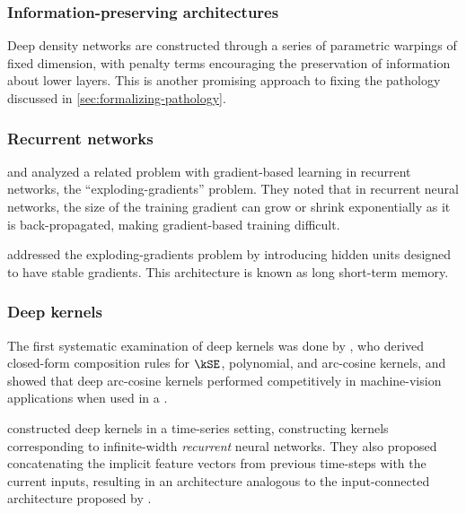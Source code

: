 \documentclass{article} %
\begin{document}
%
%
%

\subsubsection{Information-preserving architectures}
Deep density networks \citep{rippel2013high} are constructed through a series of parametric warpings of fixed dimension, with penalty terms encouraging the preservation of information about lower layers.
This is another promising approach to fixing the pathology discussed in \cref{sec:formalizing-pathology}.

\subsubsection{Recurrent networks}
\citet{bengio1994learning} and \citet{pascanu2012understanding} analyzed a related problem with gradient-based learning in recurrent networks, the ``exploding-gradients'' problem.
They noted that in recurrent neural networks, the size of the training gradient can grow or shrink exponentially as it is back-propagated, making gradient-based training difficult.

\citet{hochreiter1997long} addressed the exploding-gradients problem by introducing hidden units designed to have stable gradients.
This architecture is known as long short-term memory.

\subsubsection{Deep kernels}

The first systematic examination of deep kernels was done by \citet{cho2009kernel}, who derived closed-form composition rules for $\kSE$, polynomial, and arc-cosine kernels, and showed that deep arc-cosine kernels performed competitively in machine-vision applications when used in a \SVM{}.

\citet{hermans2012recurrent} constructed deep kernels in a time-series setting, constructing kernels corresponding to infinite-width \emph{recurrent} neural networks.
They also proposed concatenating the implicit feature vectors from previous time-steps with the current inputs, resulting in an architecture analogous to the input-connected architecture proposed by \citet[chapter 2]{neal1995bayesian}.
\end{document}
